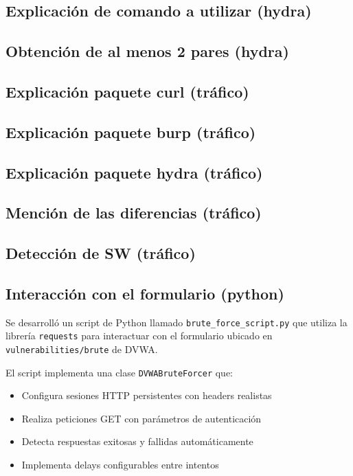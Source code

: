 \documentclass[letter,12pt]{article}
\begin{document}
\subsection{Explicación de comando a utilizar (hydra)}

\subsection{Obtención de al menos 2 pares (hydra)}

\subsection{Explicación paquete curl (tráfico)}

\subsection{Explicación paquete burp (tráfico)}

\subsection{Explicación paquete hydra (tráfico)}

\subsection{Mención de las diferencias (tráfico)}

\subsection{Detección de SW (tráfico)}

\subsection{Interacción con el formulario (python)}

Se desarrolló un script de Python llamado \texttt{brute\_force\_script.py} que utiliza la librería \texttt{requests} para interactuar con el formulario ubicado en \texttt{vulnerabilities/brute} de DVWA.

El script implementa una clase \texttt{DVWABruteForcer} que:
\begin{itemize}
    \item Configura sesiones HTTP persistentes con headers realistas
    \item Realiza peticiones GET con parámetros de autenticación
    \item Detecta respuestas exitosas y fallidas automáticamente
    \item Implementa delays configurables entre intentos
\end{itemize}
\end{document}
